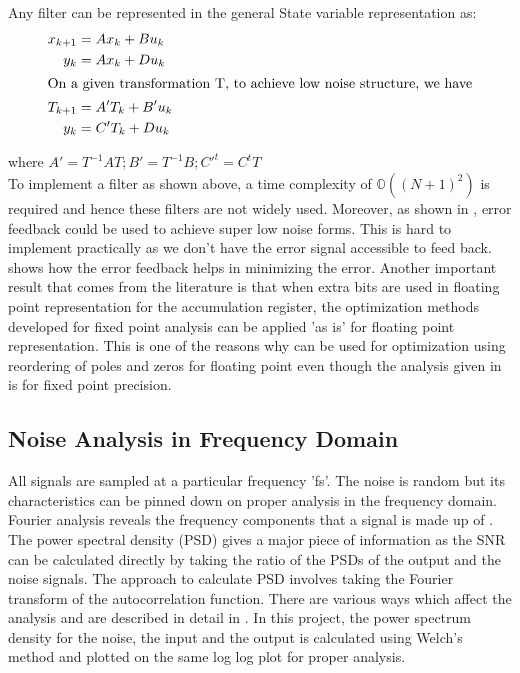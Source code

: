 \documentclass[a4paper,12pt]{article}
\begin{document}
Any filter can be represented in the general State variable representation as:
\begin{align}
x_{k+1} &= Ax_{k} + Bu_{k} \\
y_{k} &= Ax_{k} + Du_{k} \\
\intertext {On a given transformation T, to achieve low noise structure, we have}
T_{k+1} &= A'T_{k} + B'u_{k}\\
y_{k} &= C'T_{k} + Du_{k}
\end{align}

where $A'=T^{-1}AT; B'=T^{-1}B; C'^{t}=C^{t}T$
\\To implement a filter as shown above, a time complexity of $\mathbb{O}((N+1)^{2})$ is required and hence these filters are not widely used. Moreover, as shown in \cite{Chang}, error feedback could be used to achieve super low noise forms. This is hard to implement practically as we don't have the error signal accessible to feed back. \cite{Mullis} shows how the error feedback helps in minimizing the error.
Another important result that comes from the literature is that when extra bits are used in floating point representation for the accumulation register, the optimization methods developed for fixed point analysis can be applied 'as is' for floating point representation\cite{Bomar}. This is one of the reasons why \cite{Dehner} can be used for  optimization using reordering of poles and zeros for floating point even though the analysis given in \cite{Dehner} is for fixed point precision.
	\subsection{Noise Analysis in Frequency Domain}
All signals are sampled at a particular frequency 'fs'. The noise is random but its characteristics can be pinned down on proper analysis in the frequency domain. Fourier analysis reveals the frequency components that a signal is made up of \cite{Oppenheim}. The power spectral density (PSD) \cite{Cerna} gives a major piece of information as the SNR can be calculated directly by taking the ratio of the PSDs of the output and the noise signals. The approach to calculate PSD involves taking the Fourier transform of the autocorrelation function. There are various ways which affect the analysis and are described in detail in \cite{Kanner}. In this project, the power spectrum density for the noise, the input and the output is calculated using Welch's method \cite{Welch} and plotted on the same log log plot for proper analysis. 
\end{document}
